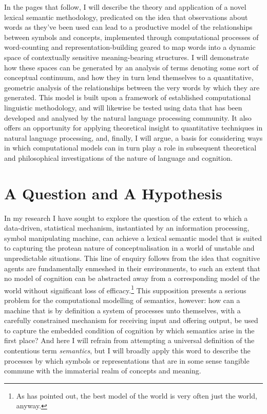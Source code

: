 In the pages that follow, I will describe the theory and application of a novel lexical semantic methodology, predicated on the idea that observations about words as they've been used can lead to a productive model of the relationships between symbols and concepts, implemented through computational processes of word-counting and representation-building geared to map words into a dynamic space of contextually sensitive meaning-bearing structures.  I will demonstrate how these spaces can be generated by an analysis of terms denoting some sort of conceptual continuum, and how they in turn lend themselves to a quantitative, geometric analysis of the relationships between the very words by which they are generated.  This model is built upon a framework of established computational linguistic methodology, and will likewise be tested using data that has been developed and analysed by the natural language processing community.  It also offers an opportunity for applying theoretical insight to quantitative techniques in natural language processing, and, finally, I will argue, a basis for considering ways in which computational models can in turn play a role in subsequent theoretical and philosophical investigations of the nature of language and cognition.

\section{A Question and A Hypothesis}
In my research I have sought to explore the question of the extent to which a data-driven, statistical mechanism, instantiated by an information processing, symbol manipulating machine, can achieve a lexical semantic model that is suited to capturing the protean nature of conceptualisation in a world of unstable and unpredictable situations.  This line of enquiry follows from the idea that cognitive agents are fundamentally enmeshed in their environments, to such an extent that no model of cognition can be abstracted away from a corresponding model of the world without significant loss of efficacy.\footnote{As \cite{Brooks1991} has pointed out, the best model of the world is very often just the world, anyway.}  This supposition presents a serious problem for the computational modelling of semantics, however: how can a machine that is by definition a system of processes unto themselves, with a carefully constrained mechanism for receiving input and offering output, be used to capture the embedded condition of cognition by which semantics arise in the first place?  And here I will refrain from attempting a universal definition of the contentious term \emph{semantics}, but I will broadly apply this word to describe the processes by which symbols or representations that are in some sense tangible commune with the immaterial realm of concepts and meaning.

